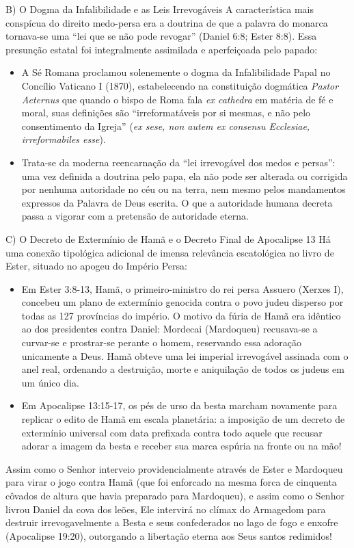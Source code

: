 \documentclass[11pt,a4paper,openany]{book}
\begin{document}
B) O Dogma da Infalibilidade e as Leis Irrevogáveis
A característica mais conspícua do direito medo-persa era a doutrina de que a palavra do monarca tornava-se uma ``lei que se não pode revogar'' (Daniel 6:8; Ester 8:8). Essa presunção estatal foi integralmente assimilada e aperfeiçoada pelo papado:
\begin{itemize}
  \item A Sé Romana proclamou solenemente o dogma da Infalibilidade Papal no Concílio Vaticano I (1870), estabelecendo na constituição dogmática \textit{Pastor Aeternus} que quando o bispo de Roma fala \textit{ex cathedra} em matéria de fé e moral, suas definições são ``irreformatáveis por si mesmas, e não pelo consentimento da Igreja'' (\textit{ex sese, non autem ex consensu Ecclesiae, irreformabiles esse}).
  \item Trata-se da moderna reencarnação da ``lei irrevogável dos medos e persas'': uma vez definida a doutrina pelo papa, ela não pode ser alterada ou corrigida por nenhuma autoridade no céu ou na terra, nem mesmo pelos mandamentos expressos da Palavra de Deus escrita. O que a autoridade humana decreta passa a vigorar com a pretensão de autoridade eterna.
\end{itemize}


C) O Decreto de Extermínio de Hamã e o Decreto Final de Apocalipse 13
Há uma conexão tipológica adicional de imensa relevância escatológica no livro de Ester, situado no apogeu do Império Persa:
\begin{itemize}
  \item Em Ester 3:8-13, Hamã, o primeiro-ministro do rei persa Assuero (Xerxes I), concebeu um plano de extermínio genocida contra o povo judeu disperso por todas as 127 províncias do império. O motivo da fúria de Hamã era idêntico ao dos presidentes contra Daniel: Mordecai (Mardoqueu) recusava-se a curvar-se e prostrar-se perante o homem, reservando essa adoração unicamente a Deus. Hamã obteve uma lei imperial irrevogável assinada com o anel real, ordenando a destruição, morte e aniquilação de todos os judeus em um único dia.
  \item Em Apocalipse 13:15-17, os pés de urso da besta marcham novamente para replicar o edito de Hamã em escala planetária: a imposição de um decreto de extermínio universal com data prefixada contra todo aquele que recusar adorar a imagem da besta e receber sua marca espúria na fronte ou na mão!
\end{itemize}


Assim como o Senhor interveio providencialmente através de Ester e Mardoqueu para virar o jogo contra Hamã (que foi enforcado na mesma forca de cinquenta côvados de altura que havia preparado para Mardoqueu), e assim como o Senhor livrou Daniel da cova dos leões, Ele intervirá no clímax do Armagedom para destruir irrevogavelmente a Besta e seus confederados no lago de fogo e enxofre (Apocalipse 19:20), outorgando a libertação eterna aos Seus santos redimidos!
\end{document}
